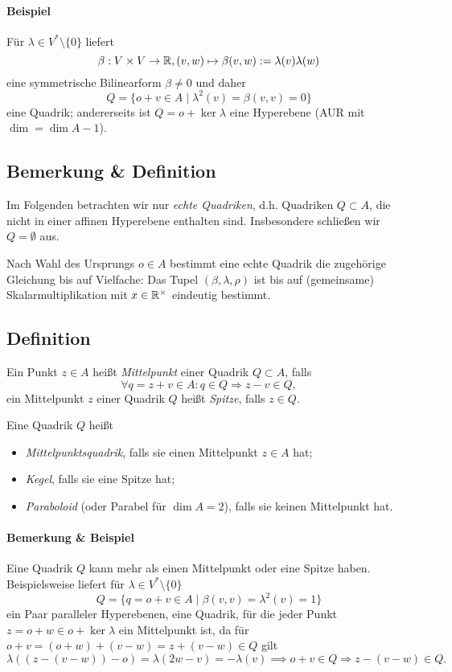 \paragraph{Beispiel}
	Für $ \lambda\in V^*\setminus\{0\} $ liefert
		\[ \beta:V\times V\to \mathbb{R}, (v,w)\mapsto \beta(v,w):=\lambda(v)\lambda(w) \]
	eine symmetrische Bilinearform $ \beta\neq 0 $ und daher
		\[ Q=\{o+v\in A\mid \lambda^2(v)=\beta(v,v) = 0 \} \]
	eine Quadrik; andererseits ist $ Q = o+\ker \lambda $ eine Hyperebene (AUR mit $ \dim = \dim A-1 $).
\subsection{Bemerkung \& Definition}
\begin{Definition}
	Im Folgenden betrachten wir nur \emph{echte Quadriken}, d.h. Quadriken $ Q\subset A $, die nicht in einer affinen Hyperebene enthalten sind.
	Insbesondere schließen wir $ Q=\emptyset $ aus. 
\end{Definition}

	Nach Wahl des Ursprungs $ o\in A $ bestimmt eine echte Quadrik die zugehörige Gleichung bis auf Vielfache: Das Tupel $ (\beta,\lambda,\rho) $ ist bis auf (gemeinsame) Skalarmultiplikation mit $ x\in\mathbb{R}^\times  $ eindeutig bestimmt.
\subsection{Definition}
\begin{Definition}
	Ein Punkt $ z\in A $ heißt \emph{Mittelpunkt} einer Quadrik $ Q\subset A $, falls
		\[ \forall q=z+v\in A: q\in Q\Rightarrow z-v\in Q, \]
	ein Mittelpunkt $ z $ einer Quadrik $ Q $ heißt \emph{Spitze}, falls $ z\in Q $.
\end{Definition}	
\begin{Definition}

	Eine Quadrik $ Q $ heißt
	\begin{itemize}
		\item \emph{Mittelpunktsquadrik}, falls sie einen Mittelpunkt $ z\in A $ hat;
		\item \emph{Kegel}, falls sie eine Spitze hat; 
		\item \emph{Paraboloid} (oder Parabel für $ \dim A = 2 $), falls sie keinen Mittelpunkt hat.
	\end{itemize}
\end{Definition}	
\paragraph{Bemerkung \& Beispiel}
	Eine Quadrik $ Q $ kann mehr als einen Mittelpunkt oder eine Spitze haben.
	Beispielsweise liefert für $ \lambda\in V^*\setminus\{0\} $
		\[ Q = \{q=o+v\in A\mid \beta(v,v) = \lambda^2(v) = 1\} \]
	ein Paar paralleler Hyperebenen, eine Quadrik, für die jeder Punkt $ z = o+w \in o+\ker \lambda $ ein Mittelpunkt ist, da für $ o+v = (o+w)+(v-w) = z+(v-w)\in Q $ gilt
		\[ \lambda\left((z-(v-w))-o\right) = \lambda(2w-v) = -\lambda(v)\implies o+v\in Q\Rightarrow z-(v-w)\in Q. \]
